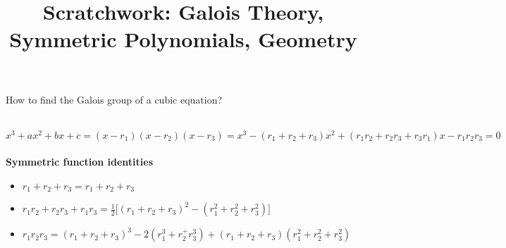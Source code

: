 \documentclass[12pt]{article}
\title{Scratchwork: Galois Theory, Symmetric Polynomials, Geometry}
\date{}
\begin{document}
\sffamily

\maketitle

\noindent How to find the Galois group of a cubic equation? 
\begin{tikzpicture}[scale=1] \end{tikzpicture} \\ 
\noindent $x^3 + ax^2 + bx + c = (x - r_1)(x-r_2)(x-r_3) = x^3 - (r_1 + r_2 + r_3)x^2 
+ (r_1 r_2 + r_2 r_3 + r_3 r_1) x - r_1 r_2 r_3 = 0$ \\ \\
\noindent \textbf{Symmetric function identities} 
\begin{itemize}
\item $r_1 + r_2 + r_3 = r_1 + r_2 + r_3$
\item $r_1r_2 + r_2 r_3 + r_1 r_3 = \frac{1}{2} \big[ (r_1 + r_2 + r_3)^2 - (r_1^2 + r_2^2 + r_3^2) \big] $
\item $r_1 r_2 r_3 = (r_1 + r_2 + r_3)^3 - 2 (r_1^3 + r_2^ + r_3^3) + (r_1 + r_2 + r_3)(r_1^2 + r_2^2 + r_3^2)$
\end{itemize}
\end{document}
